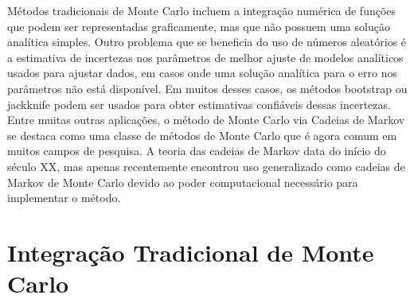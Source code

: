 Métodos tradicionais de Monte Carlo incluem a integração numérica de funções que podem ser representadas graficamente, mas que não possuem uma solução analítica simples. Outro problema que se beneficia do uso de números aleatórios é a estimativa de incertezas nos parâmetros de melhor ajuste de modelos analíticos usados para ajustar dados, em casos onde uma solução analítica para o erro nos parâmetros não está disponível. Em muitos desses casos, os métodos bootstrap ou jackknife podem ser usados para obter estimativas confiáveis dessas incertezas. Entre muitas outras aplicações, o método de Monte Carlo via Cadeias de Markov se destaca como uma classe de métodos de Monte Carlo que é agora comum em muitos campos de pesquisa. A teoria das cadeias de Markov data do início do século XX, mas apenas recentemente encontrou uso generalizado como cadeias de Markov de Monte Carlo devido ao poder computacional necessário para implementar o método.

\section{Integração Tradicional de Monte Carlo}

